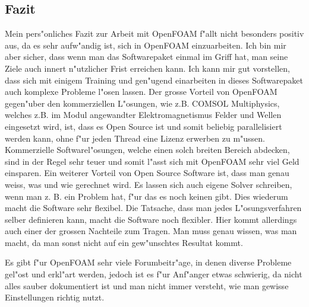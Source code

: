 \begin{refsection}
\section{Fazit}
Mein pers"onliches Fazit zur Arbeit mit OpenFOAM f"allt nicht
besonders positiv aus, da es sehr aufw"andig ist, sich in OpenFOAM
einzuarbeiten. Ich bin mir aber sicher, dass wenn man das Softwarepaket
einmal im Griff hat, man seine Ziele auch innert n"utzlicher Frist
erreichen kann. Ich kann mir gut vorstellen, dass sich mit einigem
Training und gen"ugend einarbeiten in dieses Softwarepaket auch komplexe
Probleme l"osen lassen. Der grosse Vorteil von OpenFOAM gegen"uber den
kommerziellen L"osungen, wie z.B. COMSOL Multiphysics, welches z.B. im
Modul angewandter Elektromagnetismus Felder und Wellen eingesetzt wird,
ist, dass es Open Source ist und somit beliebig parallelisiert werden
kann, ohne f"ur jeden Thread eine Lizenz erwerben zu m"ussen. Kommerzielle
Softwarel"osungen, welche einen solch breiten Bereich abdecken, sind
in der Regel sehr teuer und somit l"asst sich mit OpenFOAM sehr viel
Geld einsparen. Ein weiterer Vorteil von Open Source Software ist,
dass man genau weiss, was und wie gerechnet wird. Es lassen sich auch
eigene Solver schreiben, wenn man z. B. ein Problem hat, f"ur das es
noch keinen gibt. Dies wiederum macht die Software sehr flexibel. Die
Tatsache, dass man jedes L"osungsverfahren selber definieren kann,
macht die Software noch flexibler. Hier kommt allerdings auch einer
der grossen Nachteile zum Tragen. Man muss genau wissen, was man macht,
da man sonst nicht auf ein gew"unschtes Resultat kommt.

Es gibt f"ur OpenFOAM sehr viele Forumbeitr"age, in denen diverse Probleme
gel"ost und erkl"art werden, jedoch ist es f"ur Anf"anger etwas schwierig,
da nicht alles sauber dokumentiert ist und man nicht immer versteht,
wie man gewisse Einstellungen richtig nutzt.
\printbibliography[heading=subbibliography]
\end{refsection}
